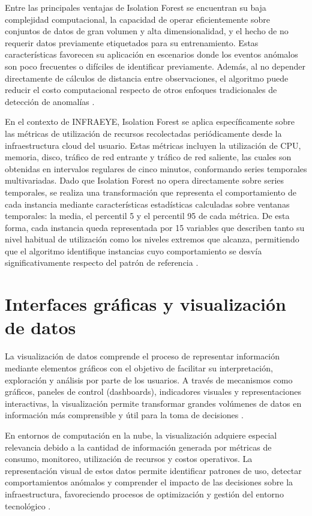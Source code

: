Entre las principales ventajas de Isolation Forest se encuentran su baja complejidad computacional, la capacidad de operar eficientemente sobre conjuntos de datos de gran volumen y alta dimensionalidad, y el hecho de no requerir datos previamente etiquetados para su entrenamiento. Estas características favorecen su aplicación en escenarios donde los eventos anómalos son poco frecuentes o difíciles de identificar previamente. Además, al no depender directamente de cálculos de distancia entre observaciones, el algoritmo puede reducir el costo computacional respecto de otros enfoques tradicionales de detección de anomalías \parencite{Chen2023}.

En el contexto de INFRAEYE, Isolation Forest se aplica específicamente sobre las métricas de utilización de recursos recolectadas periódicamente desde la infraestructura cloud del usuario. Estas métricas incluyen la utilización de CPU, memoria, disco, tráfico de red entrante y tráfico de red saliente, las cuales son obtenidas en intervalos regulares de cinco minutos, conformando series temporales multivariadas. Dado que Isolation Forest no opera directamente sobre series temporales, se realiza una transformación que representa el comportamiento de cada instancia mediante características estadísticas calculadas sobre ventanas temporales: la media, el percentil 5 y el percentil 95 de cada métrica. De esta forma, cada instancia queda representada por 15 variables que describen tanto su nivel habitual de utilización como los niveles extremos que alcanza, permitiendo que el algoritmo identifique instancias cuyo comportamiento se desvía significativamente respecto del patrón de referencia \parencite{Chen2023}.

\section{Interfaces gráficas y visualización de datos}

La visualización de datos comprende el proceso de representar información mediante elementos gráficos con el objetivo de facilitar su interpretación, exploración y análisis por parte de los usuarios. A través de mecanismos como gráficos, paneles de control (dashboards), indicadores visuales y representaciones interactivas, la visualización permite transformar grandes volúmenes de datos en información más comprensible y útil para la toma de decisiones \parencite{Munzner2014}.

En entornos de computación en la nube, la visualización adquiere especial relevancia debido a la cantidad de información generada por métricas de consumo, monitoreo, utilización de recursos y costos operativos. La representación visual de estos datos permite identificar patrones de uso, detectar comportamientos anómalos y comprender el impacto de las decisiones sobre la infraestructura, favoreciendo procesos de optimización y gestión del entorno tecnológico \parencite{Munzner2014}.


